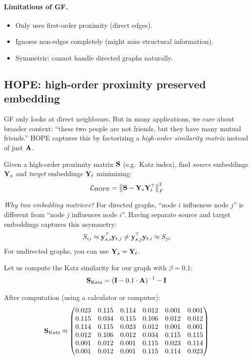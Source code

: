 \begin{notechapter}
\paragraph{Limitations of GF.}
\begin{itemize}
    \item Only uses first-order proximity (direct edges).
    \item Ignores non-edges completely (might miss structural information).
    \item Symmetric: cannot handle directed graphs naturally.
\end{itemize}

\subsection{HOPE: high-order proximity preserved embedding}

\begin{intuition}[Motivation]
GF only looks at direct neighbours. But in many applications, we care about broader context: ``these two people are not friends, but they have many mutual friends.'' HOPE captures this by factorizing a \emph{high-order similarity matrix} instead of just $\mathbf{A}$.
\end{intuition}

\begin{definition}
Given a high-order proximity matrix $\mathbf{S}$ (e.g.\ Katz index), find \emph{source} embeddings $\mathbf{Y}_s$ and \emph{target} embeddings $\mathbf{Y}_t$ minimizing:
\[
\mathcal{L}_{\text{HOPE}} = \left\| \mathbf{S} - \mathbf{Y}_s \mathbf{Y}_t^\top \right\|_F^2
\]
\end{definition}

\begin{keyidea}
\emph{Why two embedding matrices?} For directed graphs, ``node $i$ influences node $j$'' is different from ``node $j$ influences node $i$''. Having separate source and target embeddings captures this asymmetry:
\[
S_{ij} \approx \mathbf{y}_{s,i}^\top \mathbf{y}_{t,j} \neq \mathbf{y}_{s,j}^\top \mathbf{y}_{t,i} \approx S_{ji}
\]
For undirected graphs, you can use $\mathbf{Y}_s = \mathbf{Y}_t$.
\end{keyidea}

\begin{example}
Let us compute the Katz similarity for our graph with $\beta = 0.1$:
\[
\mathbf{S}_{\text{Katz}} = (\mathbf{I} - 0.1 \cdot \mathbf{A})^{-1} - \mathbf{I}
\]

After computation (using a calculator or computer):
\[
\mathbf{S}_{\text{Katz}} \approx \begin{pmatrix}
0.023 & 0.115 & 0.114 & 0.012 & 0.001 & 0.001 \\
0.115 & 0.034 & 0.115 & 0.106 & 0.012 & 0.012 \\
0.114 & 0.115 & 0.023 & 0.012 & 0.001 & 0.001 \\
0.012 & 0.106 & 0.012 & 0.034 & 0.115 & 0.115 \\
0.001 & 0.012 & 0.001 & 0.115 & 0.023 & 0.114 \\
0.001 & 0.012 & 0.001 & 0.115 & 0.114 & 0.023
\end{pmatrix}
\]


\end{example}
\end{notechapter}
